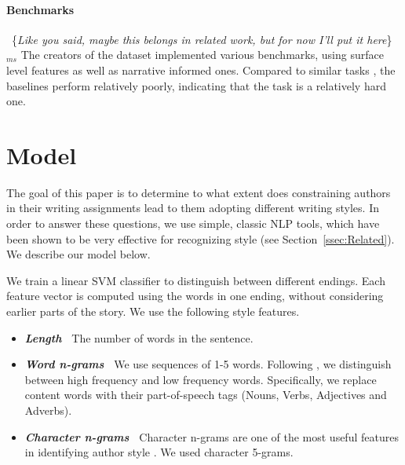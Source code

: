 \documentclass[11pt,a4paper]{article}
\newcommand{\secref}[1]{Section~\ref{ssec:#1}}
\newcommand{\isectionb}[1]{\section{#1}\label{ssec:#1}}
\newcommand{\ms}[1]{{\color{cyan}\{\textit{#1}\}$_{ms}$}}
\newcommand{\roy}[1]{\footnote{\color{red}{\textbf{Roy: #1}}}}
\begin{document}
\paragraph{Benchmarks}
~\ms{Like you said, maybe this belongs in related work, but for now I'll put it here}
The creators of the dataset implemented various benchmarks, using surface level features as well as narrative informed ones. Compared to similar tasks \cite{CNN, SQUAD, SNLI}, the baselines perform relatively poorly, indicating that the task is a relatively hard one. 


\isectionb{Model}

The goal of this paper is to determine to what extent does constraining authors in their writing assignments lead to them adopting different writing styles. 
In order to answer these questions, we use simple, classic NLP tools, which have been shown to be very effective for recognizing style (see \secref{Related}).
We describe our model below.

We train a linear SVM classifier to distinguish between different endings. 
Each feature vector is computed using the words in one ending, without considering earlier parts of the story. 
We use the following style features.

\begin{itemize}
\item\textit{\textbf{Length~}} The number of words in the sentence.
\item\textit{\textbf{Word n-grams~}} We use sequences of 1-5 words. Following \cite{Tsur:2010,Schwartz:2013}, we distinguish between high frequency and low frequency words. 
Specifically, we replace content words with their part-of-speech tags (Nouns, Verbs, Adjectives and Adverbs).
\item\textit{\textbf{Character n-grams~}} Character n-grams are one of the most useful features in identifying author style \cite{Stamatatos:2009}. 
We used character 5-grams.
\end{itemize}
\end{document}
